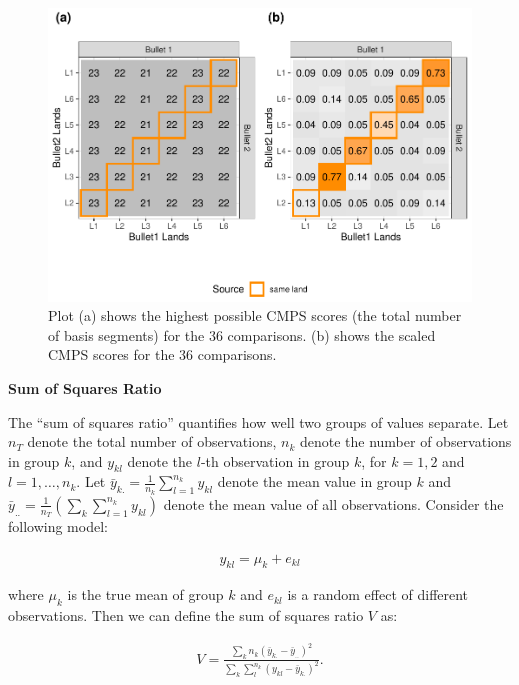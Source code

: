 \begin{Schunk}
\begin{figure}

{\centering \includegraphics[width=.7\textwidth]{ju-hofmann_files/figure-latex/tiles2-1} 

}

\caption[Plot (a) shows the highest possible CMPS scores (the total number of basis segments) for the 36 comparisons]{Plot (a) shows the highest possible CMPS scores (the total number of basis segments) for the 36 comparisons. (b) shows the scaled CMPS scores for the 36 comparisons.}\label{fig:tiles2}
\end{figure}
\end{Schunk}

\textbf{Sum of Squares Ratio}

The ``sum of squares ratio'' quantifies how well two groups of values
separate. Let \(n_T\) denote the total number of observations, \(n_k\)
denote the number of observations in group \(k\), and \(y_{kl}\) denote
the \(l\)-th observation in group \(k\), for \(k = 1,2\) and
\(l = 1, \dots, n_k\). Let
\(\bar{y}_{k.} = \frac{1}{n_k} \sum_{l=1}^{n_k} y_{kl}\) denote the mean
value in group \(k\) and
\(\bar{y}_{..} = \frac{1}{n_T} \left( \sum_{k} \sum_{l = 1}^{n_k} y_{kl} \right)\)
denote the mean value of all observations. Consider the following model:

\begin{align}
y_{kl} = \mu_k + e_{kl}
\end{align}

where \(\mu_k\) is the true mean of group \(k\) and \(e_{kl}\) is a
random effect of different observations. Then we can define the sum of
squares ratio \(V\) as:

\begin{align}
V = \frac{\sum_k n_k (\bar{y}_{k.} - \bar{y}_{..})^2}{\sum_k \sum_l^{n_k} (y_{kl} - \bar{y}_{k.})^2 }.
\end{align}

